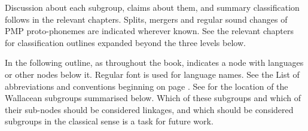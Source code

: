 Discussion about each subgroup,
claims about them, and summary classification follows in the relevant chapters.
Splits, mergers and regular sound changes of PMP proto-phonemes are indicated wherever known.
See the relevant chapters for classification outlines expanded beyond the three levels below.

In the following outline, as throughout the book,
 indicates a node with languages or other nodes below it.
Regular font is used for language names.
See the List of abbreviations
and conventions beginning on page \pageref{ch:Abb}.
See  for the location of the Wallacean subgroups summarised below.
Which of these subgroups
and which of their sub-nodes should be considered linkages,
and which should be considered subgroups in the classical sense is a task for future work.

